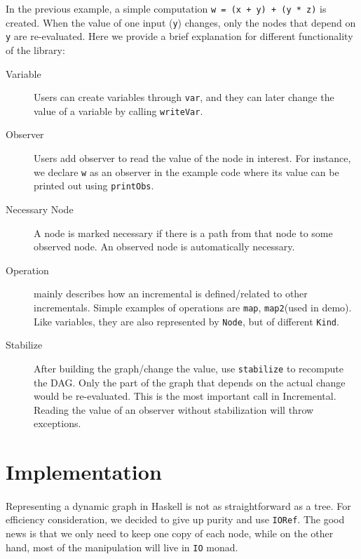 \documentclass[a4paper, twocolumn]{article}
\newcommand{\code}{\texttt} %
\begin{document}
In the previous example, a simple computation \code{w = (x + y) + (y * z)} is created. When the value of one input (\code{y}) changes, only the nodes that depend on \code{y} are re-evaluated. Here we provide a brief explanation for different functionality of the library:
\begin{description}
  \item [Variable] Users can create variables through \code{var}, and they can later change the value of a variable by calling \code{writeVar}.

  \item [Observer] Users add observer to read the value of the node in interest. For instance, we declare \code{w} as an observer in the example code where its value can be printed out using \code{printObs}. 

  \item [Necessary Node] A node is marked necessary if there is a path from that node to some observed node. An observed node is automatically necessary. 

  \item [Operation] mainly describes how an incremental is defined/related to other incrementals. Simple examples of operations are \code{map}, \code{map2}(used in demo). Like variables, they are also represented by \code{Node}, but of different \code{Kind}.

  \item [Stabilize] After building the graph/change the value, use \code{stabilize} to recompute the DAG. Only the part of the graph that depends on the actual change would be re-evaluated. This is the most important call in Incremental. Reading the value of an observer without stabilization will throw exceptions.
\end{description}

\section{Implementation}
\paragraph{} Representing a dynamic graph in Haskell is not as straightforward as a tree. For efficiency consideration, we decided to give up purity and use \code{IORef}. The good news is that we only need to keep one copy of each node, while on the other hand, most of the manipulation will live in \code{IO} monad.
\end{document}
